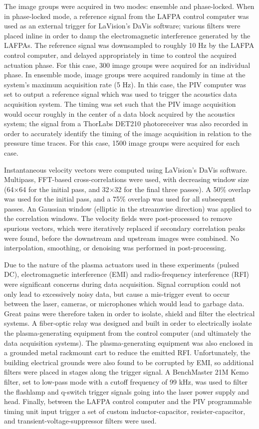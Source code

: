 The image groups were acquired in two modes: ensemble and phase-locked. 
When in phase-locked mode, a reference signal from the LAFPA control computer was used as an external trigger for LaVision's DaVis software; various filters were placed inline in order to damp the electromagnetic interference generated by the LAFPAs.
The reference signal was downsampled to roughly 10 Hz by the LAFPA control computer, and delayed appropriately in time to control the acquired actuation phase.
For this case, 300 image groups were acquired for an individual phase. 
In ensemble mode, image groups were acquired randomly in time at the system's maximum acquisition rate (5 Hz).
In this case, the PIV computer was set to output a reference signal which was used to trigger the acoustics data acquisition system.
The timing was set such that the PIV image acquisition would occur roughly in the center of a data block acquired by the acoustics system; the signal from a ThorLabs DET210 photoreceiver was also recorded in order to accurately identify the timing of the image acquisition in relation to the pressure time traces.
For this case, 1500 image groups were acquired for each case.

Instantaneous velocity vectors were computed using LaVision's DaVis software.
Multipass, FFT-based cross-correlations were used, with decreasing window size (64$\times$64 for the initial pass, and 32$\times$32 for the final three passes).
A 50\% overlap was used for the initial pass, and a 75\% overlap was used for all subsequent passes.
An Gaussian window (elliptic in the streamwise direction) was applied to the correlation windows.
The velocity fields were post-processed to remove spurious vectors, which were iteratively replaced if secondary correlation peaks were found, before the downstream and upstream images were combined.
No interpolation, smoothing, or denoising was performed in post-processing.

Due to the nature of the plasma actuators used in these experiments (pulsed DC), electromagnetic interference (EMI) and radio-frequency interference (RFI) were significant concerns during data acquisition.
Signal corruption could not only lead to excessively noisy data, but cause a mis-trigger event to occur between the laser, cameras, or microphones which would lead to garbage data.
Great pains were therefore taken in order to isolate, shield and filter the electrical systems.
A fiber-optic relay was designed and built in order to electrically isolate the plasma-generating equipment from the control computer (and ultimately the data acquisition systems).
The plasma-generating equipment was also enclosed in a grounded metal rackmount cart to reduce the emitted RFI.
Unfortunately, the building electrical grounds were also found to be corrupted by EMI, so additional filters were placed in stages along the trigger signal.
A BenchMaster 21M Kemo filter, set to low-pass mode with a cutoff frequency of 99 kHz, was used to filter the flashlamp and q-switch trigger signals going into the laser power supply and head.
Finally, between the LAFPA control computer and the PIV programmable timing unit input trigger a set of custom inductor-capacitor, resister-capacitor, and transient-voltage-suppressor filters were used. 